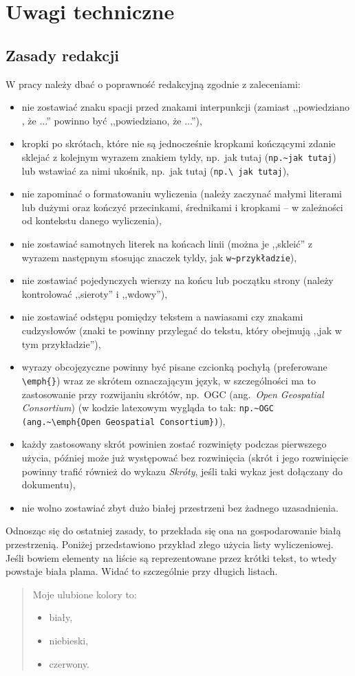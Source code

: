 \chapter{Uwagi techniczne}%
\section{Zasady redakcji}
W pracy należy dbać o poprawność redakcyjną zgodnie z zaleceniami:
\begin{itemize}
\item nie zostawiać znaku spacji przed znakami interpunkcji (zamiast ,,powiedziano , że ...'' powinno być ,,powiedziano, że ...''),
\item kropki po skrótach, które nie są jednocześnie kropkami kończącymi zdanie sklejać z kolejnym wyrazem znakiem tyldy, np.~jak tutaj (\verb?np.~jak tutaj?) lub wstawiać za nimi ukośnik, np.\ jak tutaj (\verb?np.\ jak tutaj?),
\item nie zapominać o formatowaniu wyliczenia (należy zaczynać małymi literami lub dużymi oraz kończyć przecinkami, średnikami i kropkami -- w zależności od kontekstu danego wyliczenia),
\item nie zostawiać samotnych literek na końcach linii  (można je ,,skleić'' z wyrazem następnym stosując znaczek tyldy, jak \verb+w~przykładzie+),
\item nie zostawiać pojedynczych wierszy na końcu lub początku strony (należy kontrolować ,,sieroty'' i ,,wdowy''),
\item nie zostawiać odstępu pomiędzy tekstem a nawiasami czy znakami cudzysłowów (znaki te powinny przylegać do tekstu, który obejmują ,,jak w tym przykładzie''),
\item wyrazy obcojęzyczne powinny być pisane czcionką pochyłą (preferowane \verb|\emph{}|) wraz ze skrótem oznaczającym język, w szczególności ma to zastosowanie przy rozwijaniu skrótów, np.~OGC (ang.~\emph{Open Geospatial Consortium}) (w kodzie latexowym wygląda to tak: \verb|np.~OGC (ang.~\emph{Open Geospatial Consortium})|),
\item każdy zastosowany skrót powinien zostać rozwinięty podczas pierwszego użycia, później może już występować bez rozwinięcia (skrót i jego rozwinięcie powinny trafić również do wykazu \emph{Skróty}, jeśli taki wykaz jest dołączany do dokumentu),
\item nie wolno zostawiać zbyt dużo białej przestrzeni bez żadnego uzasadnienia. 
\end{itemize}

Odnosząc się do ostatniej zasady, to przekłada się ona na gospodarowanie białą przestrzenią. Poniżej przedstawiono przykład złego użycia listy wyliczeniowej. Jeśli bowiem elementy na liście są reprezentowane przez krótki tekst, to wtedy powstaje biała plama. Widać to szczególnie przy długich listach.
\begin{quotation}
	\noindent Moje ulubione kolory to:
	\begin{itemize}
	\item biały,
	\item niebieski,
	\item czerwony.
	\end{itemize}
\end{quotation}

